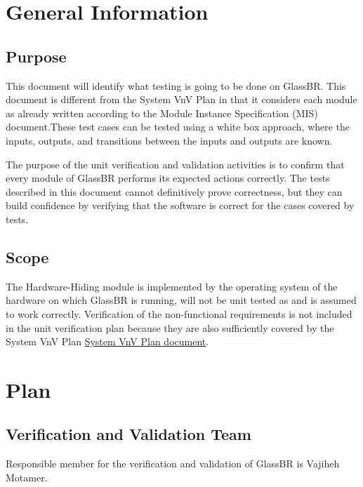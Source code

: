 \documentclass[12pt]{article}
\newcommand{\progname}{GlassBR}
\begin{document}
\section{General Information}

\subsection{Purpose}

\noindent This document will identify what testing is going to be done on \progname{}. 
This document is different from the System VnV Plan in that it considers each 
module as already written according to the Module Instance Specification (MIS) 
document.These test cases can be tested using a white box approach, where the inputs, outputs, and 
transitions between the inputs and outputs are known.

\noindent The purpose of the unit verification and validation activities is to 
confirm that every module of \progname{} performs its expected actions 
correctly. The tests described in this document cannot definitively prove 
correctness, but they can build confidence by verifying that the software is 
correct for the cases covered by tests.

\subsection{Scope} \label{Scope}

\noindent The Hardware-Hiding module is implemented by the operating system of the hardware on which \progname{} 
is running, will not be unit tested as 
 and is assumed to work correctly. Verification of the non-functional requirements is 
not included in the unit verification plan because they are also sufficiently 
covered by the System VnV Plan \href{https://github.com/smiths/caseStudies/blob/glass_UnitVnV/CaseStudies/glass/docs/VnVPlan/SystVnVPlan/SystVnVPlan.pdf}
{System VnV Plan document}.


\section{Plan} \label{sec_Plan}
	
\subsection{Verification and Validation Team}
Responsible member for the verification and validation of GlassBR is Vajiheh Motamer.
\end{document}
